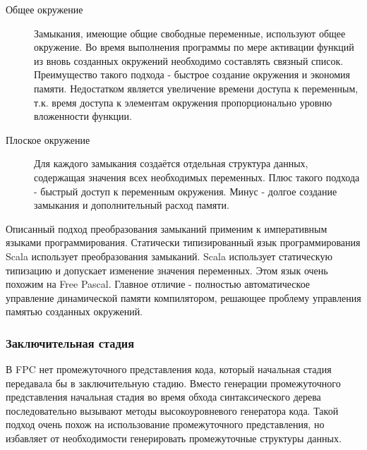 \documentclass{imcs}
\begin{document}
\begin{description}
    \item[Общее окружение] Замыкания, имеющие общие свободные переменные,
используют общее окружение. Во время выполнения программы по мере активации функций
из вновь созданных окружений необходимо составлять связный список.
Преимущество такого подхода - быстрое создание окружения и экономия памяти. Недостатком
является увеличение времени доступа к переменным, т.к. время доступа к элементам
окружения пропорционально уровню вложенности функции.
    \item[Плоское окружение] Для каждого замыкания создаётся отдельная структура данных,
содержащая значения всех необходимых переменных. Плюс такого подхода - быстрый доступ
к переменным окружения. Минус - долгое создание замыкания и дополнительный расход памяти.
\end{description}

Описанный подход преобразования замыканий применим к императивным языками
программирования. Статически типизированный язык программирования Scala
использует преобразования замыканий\cite{scalaoverview}\cite{scalaclosure}.
Scala использует статическую типизацию и допускает изменение значения переменных. Этом
язык очень похожим на Free Pascal. Главное отличие - полностью автоматическое
управление динамической памяти компилятором, решающее проблему управления памятью
созданных окружений.

\subsubsection{Заключительная стадия}

В FPC нет промежуточного представления кода, который начальная стадия
передавала бы в заключительную стадию. Вместо генерации промежуточного представления
начальная стадия во время обхода синтаксического дерева последовательно вызывают методы
высокоуровневого генератора кода. Такой подход очень похож на использование
промежуточного представления, но избавляет от необходимости генерировать промежуточные
структуры данных.

\end{document}
